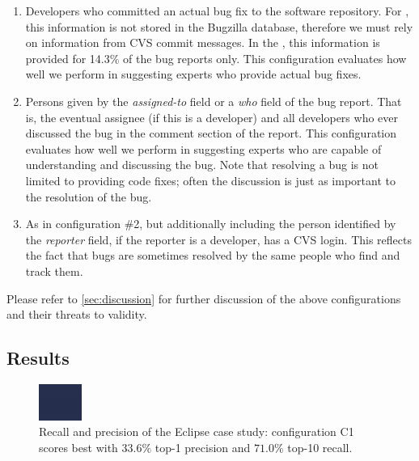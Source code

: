 \begin{enumerate}
\item Developers who committed an actual bug fix to the software repository. For \EC, this information is not stored in the Bugzilla database, therefore we must rely on information from CVS commit messages. In the \validationset, this information is provided for 14.3\% of the bug reports only. This configuration evaluates how well we perform in suggesting experts who provide actual bug fixes.
\item Persons given by the \emph{assigned-to} field or a \emph{who} field of the bug report. That is, the eventual assignee (if this is a developer) and all developers who ever discussed the bug in the comment section of the report. This configuration evaluates how well we perform in suggesting experts who are capable of understanding and discussing the bug. Note that resolving a bug is not limited to providing code fixes; often the discussion is just as important to the resolution of the bug. 
\item As in configuration \#2, but additionally including the person identified by the \emph{reporter} field, if the reporter is a developer, \ie has a CVS login.  This reflects the fact that bugs are sometimes resolved by the same people who find and track them.
\end{enumerate}

Please refer to \autoref{sec:discussion} for further discussion of the above configurations and their threats to validity.

\subsection{Results}\label{therealthing}

\begin{figure}
    \includegraphics[width=\linewidth]{runOnTestSet}
    \caption{Recall and precision of the Eclipse case study: configuration C1 scores best with $33.6\%$ top-1 precision and $71.0\%$ top-10 recall.}
    \label{fig:eclipse}
\end{figure} 


